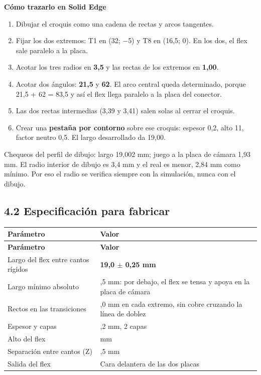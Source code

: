 \documentclass[11pt,a4paper]{article}
\newenvironment{notadato}[1]
  {\begin{notadatobase}{\sffamily\scriptsize\bfseries\color{navy}#1}\par\vspace{2pt}}
  {\end{notadatobase}}
\begin{document}
\begin{notadato}{Cómo trazarlo en Solid Edge}
\begin{enumerate}
\item Dibujar el croquis como una cadena de rectas y arcos tangentes.
\item Fijar los dos extremos: T1 en (32; $-$5) y T8 en (16,5; 0). En los dos, el flex sale paralelo a la placa.
\item Acotar los tres radios en \textbf{3,5} y las rectas de los extremos en \textbf{1,00}.
\item Acotar dos ángulos: \textbf{21,5\textdegree{}} y \textbf{62\textdegree{}}. El arco central queda determinado, porque 21,5 + 62 = 83,5\textdegree{} y así el flex llega paralelo a la placa del conector.
\item Las dos rectas intermedias (3,39 y 3,41) salen solas al cerrar el croquis.
\item Crear una \textbf{pestaña por contorno} sobre ese croquis: espesor 0,2, alto 11, factor neutro 0,5. El largo desarrollado da 19,00.
\end{enumerate}

\end{notadato}
Chequeos del perfil de dibujo: largo 19,002 mm; juego a la placa de cámara 1,93 mm. El radio interior de dibujo es 3,4 mm y el real es menor, 2,84 mm como mínimo. Por eso el radio se verifica siempre con la simulación, nunca con el dibujo.


\subsection*{4.2 Especificación para fabricar}

\begingroup\footnotesize
\setlength{\tabcolsep}{4pt}
\setlength{\emergencystretch}{4em}
 
\begin{longtable}{@{}>{\RaggedRight\arraybackslash}p{}>{\RaggedRight\arraybackslash}p{}@{}}
\toprule
\scriptsize\textbf{Parámetro} & \scriptsize\textbf{Valor} \\
\midrule
\endfirsthead
\toprule
\scriptsize\textbf{Parámetro} & \scriptsize\textbf{Valor} \\
\midrule
\endhead
\bottomrule
\endfoot
Largo del flex entre cantos rígidos & \textbf{19,0 $\pm$ 0,25 mm} \\
Largo mínimo absoluto & 18,5 mm: por debajo, el flex se tensa y apoya en la placa de cámara \\
Rectos en las transiciones & 1,0 mm en cada extremo, sin cobre cruzando la línea de doblez \\
Espesor y capas & 0,2 mm, 2 capas \\
Alto del flex & 11 mm \\
Separación entre cantos (Z) & 15,5 mm \\
Salida del flex & Cara delantera de las dos placas \\
\end{longtable}
\endgroup
\end{document}

